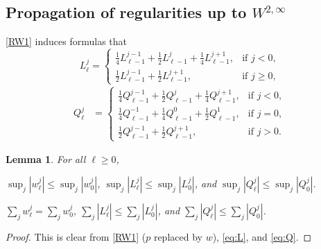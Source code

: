 \documentclass[a4paper,11pt]{article}
\def\l{{h}}
\newtheorem{lemma}{Lemma}[section]
\theoremstyle{remark}
\begin{document}
\subsection{Propagation of regularities up to $W^{2,\infty}$}
\eqref{RW1} induces formulas that 
\begin{equation} \label{eq:L}
L^j_\ell = \left\{\begin{array}{ll}
        \frac{1}{4}L_{\ell-1}^{j-1} + \frac{1}{2}L_{\ell-1}^j + \frac{1}{4}L_{\ell-1}^{j+1}, & \text{if $j<0$},\\
        \frac{1}{2}L_{\ell-1}^{j-1} + \frac{1}{2}L_{\ell-1}^{j+1}, & \text{if $j\ge0$},
        \end{array}\right.
\end{equation}
\begin{equation}\label{eq:Q}
\begin{aligned}
Q^j_\ell %
&=\left\{\begin{array}{ll}
        \frac{1}{4}Q_{\ell-1}^{j-1} + \frac{1}{2}Q_{\ell-1}^{j} + \frac{1}{4}Q_{\ell-1}^{j+1}, & \text{if $j<0$},\\
        \frac{1}{4}Q_{\ell-1}^{-1} + \frac{1}{4}Q_{\ell-1}^{0} + \frac{1}{2}Q_{\ell-1}^{1}, & \text{if $j=0$},\\
        \frac{1}{2}Q_{\ell-1}^{j-1} + \frac{1}{2}Q_{\ell-1}^{j+1}, & \text{if $j>0$}.
        \end{array}\right.
 \end{aligned}
\end{equation}
\begin{lemma} \label{uniform_est}
 For all $\ell\ge0$,
 
 $ \displaystyle\sup _{j} |w^j_\ell| \le \sup _{j} |w^j_0|$, $ \displaystyle\sup _{j} |L^j_\ell| \le \sup _{j} |L^j_0|$, and $\displaystyle \sup _{j} |Q^j_\ell| \le \sup _{j} |Q^j_0|$.
 
 $ \displaystyle\sum _{j} w^j_\ell = \sum _{j} w^j_0$, $ \displaystyle\sum _{j} |L^j_\ell| \le \sum _{j} |L^j_0|$, and $\displaystyle \sum _{j} |Q^j_\ell| \le \sum _{j} |Q^j_0|$.
\end{lemma}
\begin{proof}
 This is clear from \eqref{RW1} ($p$ replaced by $w$), \eqref{eq:L}, and \eqref{eq:Q}.
\end{proof}
% 
% 
\end{document}
